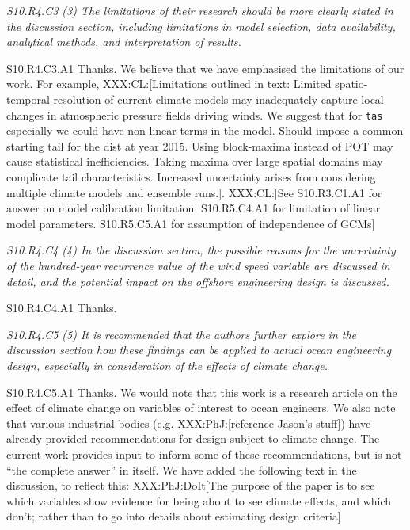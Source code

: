 \documentclass[a4paper,10pt]{article}
\providecommand{\TA}{\texttt{tas}\xspace}
\begin{document}
	\emph{S10.R4.C3 (3) The limitations of their research should be more clearly stated in the discussion section, including limitations in model selection, data availability, analytical methods, and interpretation of results.}

	S10.R4.C3.A1 Thanks. We believe that we have emphasised the limitations of our work. For example, XXX:CL:[Limitations outlined in text: Limited spatio-temporal resolution of current climate models may inadequately capture local changes in atmospheric pressure fields driving winds. We suggest that for \TA especially we could have non-linear terms in the model. Should impose a common starting tail for the dist at year 2015. Using block-maxima instead of POT may cause statistical inefficiencies. Taking maxima over large spatial domains may complicate tail characteristics. Increased uncertainty arises from considering multiple climate models and ensemble runs.]. XXX:CL:[See S10.R3.C1.A1 for answer on model calibration limitation. S10.R5.C4.A1 for limitation of linear model parameters. S10.R5.C5.A1 for assumption of independence of GCMs]

	\emph{S10.R4.C4 (4) In the discussion section, the possible reasons for the uncertainty of the hundred-year recurrence value of the wind speed variable are discussed in detail, and the potential impact on the offshore engineering design is discussed.}

	S10.R4.C4.A1 Thanks.

	\emph{S10.R4.C5 (5) It is recommended that the authors further explore in the discussion section how these findings can be applied to actual ocean engineering design, especially in consideration of the effects of climate change.}

	S10.R4.C5.A1 Thanks. We would note that this work is a research article on the effect of climate change on variables of interest to ocean engineers. We also note that various industrial bodies (e.g. XXX:PhJ:[reference Jason's stuff]) have already provided recommendations for design subject to climate change. The current work provides input to inform some of these recommendations, but is not ``the complete answer'' in itself. We have added the following text in the discussion, to reflect this: XXX:PhJ:DoIt[The purpose of the paper is to see which variables show evidence for being about to see climate effects, and which don't; rather than to go into details about estimating design criteria]
\end{document}
